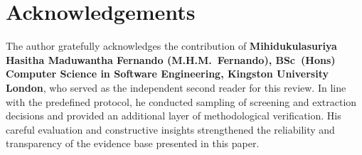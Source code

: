 \section{Acknowledgements}

The author gratefully acknowledges the contribution of 
\textbf{Mihidukulasuriya Hasitha Maduwantha Fernando (M.H.M.~Fernando), 
BSc~(Hons) Computer Science in Software Engineering, Kingston University London},
who served as the independent second reader for this review. In line with the 
predefined protocol, he conducted sampling of screening and extraction decisions 
and provided an additional layer of methodological verification. His careful 
evaluation and constructive insights strengthened the reliability and 
transparency of the evidence base presented in this paper.
